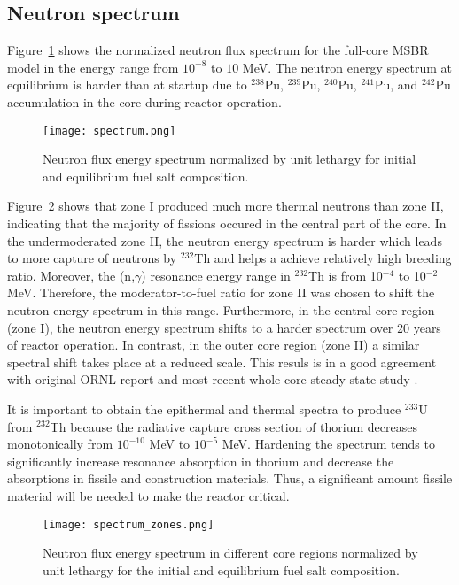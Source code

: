 \subsection{Neutron spectrum}
Figure~\ref{fig:spectrum} shows the normalized neutron flux spectrum for the full-core \gls{MSBR} model in the energy range from $10^{-8}$ to $10$ MeV. The neutron energy spectrum at equilibrium is harder than at startup due to $^{238}$Pu, $^{239}$Pu, $^{240}$Pu, $^{241}$Pu, and $^{242}$Pu accumulation in the core during reactor operation. 
\begin{figure}[ht!] %
  \centering
  \texttt{[image: spectrum.png]} 
  \caption{Neutron flux energy spectrum normalized by unit lethargy for initial and equilibrium fuel salt composition.}
  \label{fig:spectrum}
\end{figure}
Figure~\ref{fig:spectrum_zones} shows that zone I produced much more thermal neutrons than zone II, indicating that the majority of fissions occured in the central part of the core. In the undermoderated zone II, the neutron energy spectrum is harder which leads to more capture of neutrons by $^{232}$Th and helps a achieve relatively high breeding ratio. Moreover, the (n,$\gamma$) resonance energy range in $^{232}$Th is from 10$^{-4}$ to 10$^{-2}$ MeV. Therefore, the moderator-to-fuel ratio for zone II was chosen to shift the neutron energy spectrum in this range. Furthermore, in the central core region (zone I), the neutron energy spectrum shifts to a harder spectrum over 20 years of reactor operation. In contrast, in the outer core region (zone II) a similar spectral shift takes place at a reduced scale. This resuls is in a good agreement with original ORNL report \cite{robertson_conceptual_1971} and most recent whole-core steady-state study \cite{park_whole_2015}.

It is important to obtain the epithermal and thermal spectra to produce $^{233}$U from $^{232}$Th because the radiative capture cross section of thorium decreases monotonically from $10^{-10}$ MeV to $10^{-5}$ MeV. Hardening the spectrum tends to significantly increase resonance absorption in thorium and decrease the absorptions in fissile and construction materials. Thus, a significant amount fissile material will be needed to make the reactor critical. 
\begin{figure}[ht!] %
  \centering
  \texttt{[image: spectrum\_zones.png]} 
  \caption{Neutron flux energy spectrum in different core regions normalized by unit lethargy for the initial and equilibrium fuel salt composition.}
  \label{fig:spectrum_zones}
\end{figure}

